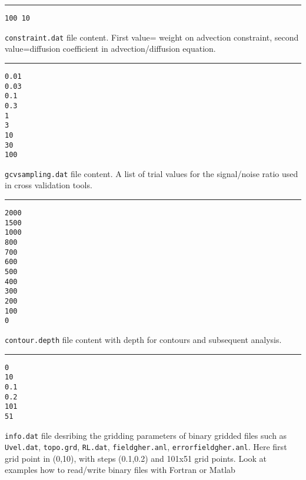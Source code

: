 \begin{multicols}{2}
\begin{minipage}{9cm}
\rule{\textwidth}{10pt}
{\scriptsize{
\begin{verbatim}
100 10
\end{verbatim}
}}
\makebox[\textwidth]{\hrulefill}
{{\tt constraint.dat} file content. 
First value= weight on advection constraint, second value=diffusion coefficient in advection/diffusion equation.}
\end{minipage}

\begin{minipage}{9cm}
\rule{\textwidth}{10pt}
{\scriptsize{
\begin{verbatim}
0.01
0.03
0.1
0.3
1
3
10
30
100
\end{verbatim}
}}
\makebox[\textwidth]{\hrulefill}
{{\tt gcvsampling.dat} file content. A list of trial values for the signal/noise ratio used in cross validation tools.}
\end{minipage}

\begin{minipage}{9cm}
\rule{\textwidth}{10pt}
{\scriptsize{
\begin{verbatim}
2000
1500
1000
800
700
600
500
400
300
200
100
0
\end{verbatim}
}}
\makebox[\textwidth]{\hrulefill}
{{\tt contour.depth} file content with depth for contours and subsequent analysis.}
\end{minipage}

\begin{minipage}{9cm}
\rule{\textwidth}{10pt}
{\scriptsize{
\begin{verbatim}
0
10
0.1
0.2
101
51
\end{verbatim}
}}
\makebox[\textwidth]{\hrulefill}
{{\tt *info.dat} file desribing the gridding parameters of binary gridded files such as {\tt Uvel.dat}, {\tt topo.grd}, {\tt RL.dat}, {\tt fieldgher.anl}, {\tt errorfieldgher.anl}. Here first grid point in (0,10), with steps (0.1,0.2) and 101x51 grid points. Look at examples how to read/write binary files with Fortran or Matlab}
\end{minipage}



\end{multicols}

